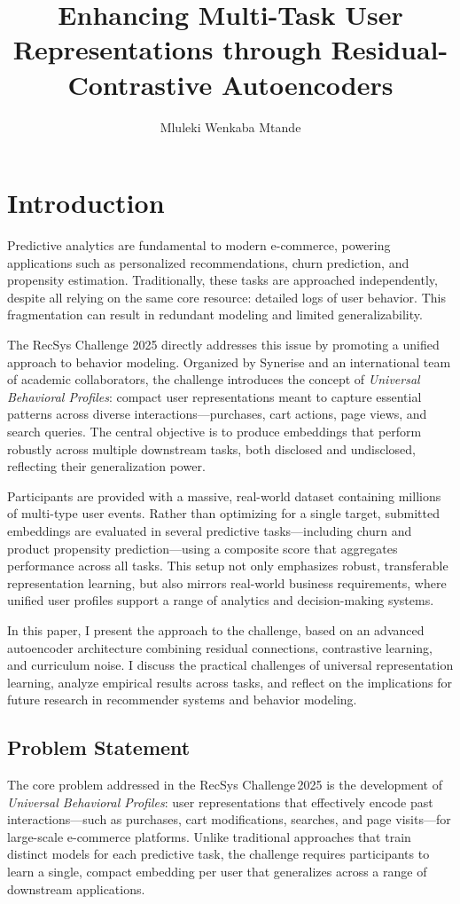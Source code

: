\documentclass[sigconf]{acmart}
\title{Enhancing Multi-Task User Representations through Residual-Contrastive Autoencoders}
\author{Mluleki Wenkaba Mtande}
\affiliation{
  \institution{Independent Researcher}
  \city{Taichung}
  \country{Taiwan}
}
\begin{document}
\maketitle

\section{Introduction}
Predictive analytics are fundamental to modern e-commerce, powering applications such as personalized recommendations, churn prediction, and propensity estimation. Traditionally, these tasks are approached independently, despite all relying on the same core resource: detailed logs of user behavior. This fragmentation can result in redundant modeling and limited generalizability.

The RecSys Challenge 2025 \cite{recsys2025} directly addresses this issue by promoting a unified approach to behavior modeling. Organized by Synerise and an international team of academic collaborators, the challenge introduces the concept of \emph{Universal Behavioral Profiles}: compact user representations meant to capture essential patterns across diverse interactions—purchases, cart actions, page views, and search queries. The central objective is to produce embeddings that perform robustly across multiple downstream tasks, both disclosed and undisclosed, reflecting their generalization power.

Participants are provided with a massive, real-world dataset containing millions of multi-type user events. Rather than optimizing for a single target, submitted embeddings are evaluated in several predictive tasks—including churn and product propensity prediction—using a composite score that aggregates performance across all tasks. This setup not only emphasizes robust, transferable representation learning, but also mirrors real-world business requirements, where unified user profiles support a range of analytics and decision-making systems.

In this paper, I present the approach to the challenge, based on an advanced autoencoder architecture combining residual connections, contrastive learning, and curriculum noise. I discuss the practical challenges of universal representation learning, analyze empirical results across tasks, and reflect on the implications for future research in recommender systems and behavior modeling.

\subsection{Problem Statement}
The core problem addressed in the RecSys Challenge 2025 is the development of \emph{Universal Behavioral Profiles}: user representations that effectively encode past interactions—such as purchases, cart modifications, searches, and page visits—for large-scale e-commerce platforms. Unlike traditional approaches that train distinct models for each predictive task, the challenge requires participants to learn a single, compact embedding per user that generalizes across a range of downstream applications.
\end{document}
